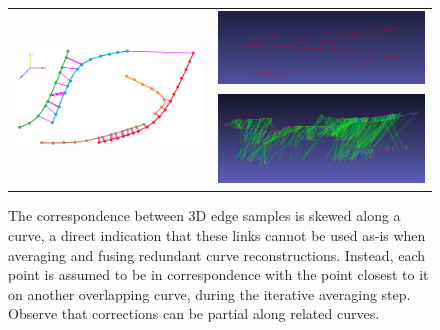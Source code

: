 \documentclass[a4paper,titlepage]{article}
\begin{document}
\begin{figure}
	\captionsetup[subfigure]{labelformat=empty}
	\centering
	\begin{tabular}{cc}
		\multirow{2}[2]{*}[13mm]{\includegraphics[width=0.55\linewidth]{figs/need-for-clusters.png}} &
		\includegraphics[width=0.45\linewidth]{figs/cluster7.png}\\
		&
		\includegraphics[width=0.45\linewidth]{figs/cluster7-corr.png}
		\\
	\end{tabular}
	\caption{\small 
		The correspondence between 3D edge samples is skewed along a curve, a direct indication that these links cannot be used as-is when averaging and fusing redundant curve reconstructions. Instead, each point is assumed to be in correspondence with the point closest to it on another overlapping curve, during the iterative averaging step. Observe that corrections can be partial along related
		curves.
	}
	\label{fig:overlap:masks}
\end{figure}

\end{document}
